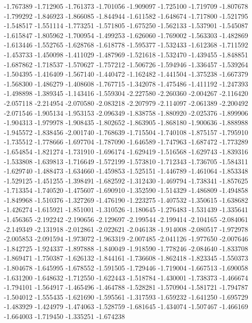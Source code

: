-1.767389
-1.712905
-1.761373
-1.701056
-1.909097
-1.725100
-1.719709
-1.807678
-1.799292
-1.846923
-1.866085
-1.844944
-1.611582
-1.648674
-1.717800
-1.521795
-1.548517
-1.551114
-1.773251
-1.571805
-1.675250
-1.562133
-1.537901
-1.545087
-1.615847
-1.805962
-1.700954
-1.499253
-1.626060
-1.769002
-1.563303
-1.482869
-1.613446
-1.552765
-1.628768
-1.618778
-1.595377
-1.532433
-1.612368
-1.711592
-1.453733
-1.450098
-1.411029
-1.487969
-1.521618
-1.532470
-1.439455
-1.848851
-1.687862
-1.718537
-1.570627
-1.757212
-1.506726
-1.594946
-1.336457
-1.539264
-1.504395
-1.416409
-1.567140
-1.440472
-1.162482
-1.441504
-1.375238
-1.667379
-1.568300
-1.486279
-1.408608
-1.767715
-1.342078
-1.475486
-1.411192
-1.247393
-1.498898
-1.389345
-1.143416
-1.559304
-2.227580
-2.260360
-2.004267
-2.116420
-2.057118
-2.214954
-2.070580
-2.083218
-2.207979
-2.114097
-2.061389
-2.200492
-2.071546
-1.905134
-1.953153
-2.096349
-1.838758
-1.880920
-2.025376
-1.899906
-1.904313
-1.979978
-1.908435
-1.802652
-1.863905
-1.868180
-1.900636
-1.888988
-1.945572
-1.838456
-2.001740
-1.768639
-1.715504
-1.740108
-1.875157
-1.795910
-1.735512
-1.778666
-1.697704
-1.787090
-1.646589
-1.747963
-1.687472
-1.773289
-1.654854
-1.821274
-1.731910
-1.696174
-1.629419
-1.516568
-1.629743
-1.839316
-1.533808
-1.639813
-1.716649
-1.572199
-1.573810
-1.712343
-1.736705
-1.584311
-1.629740
-1.488473
-1.634660
-1.459853
-1.525151
-1.446789
-1.461064
-1.853348
-1.529125
-1.451255
-1.398491
-1.682592
-1.312430
-1.469794
-1.738341
-1.857625
-1.713354
-1.740520
-1.475607
-1.690910
-1.352590
-1.514329
-1.486809
-1.494858
-1.849968
-1.510376
-1.327269
-1.476190
-1.223275
-1.407532
-1.350615
-1.638682
-1.426274
-1.615921
-1.851001
-1.310526
-1.180645
-1.276483
-1.531439
-1.335641
-1.456365
-2.192242
-2.190656
-2.129697
-2.199544
-2.199414
-2.104165
-2.084061
-2.149349
-2.131918
-2.012861
-2.022621
-2.046138
-1.914008
-2.080517
-1.972978
-2.005853
-2.091594
-1.973072
-1.963319
-2.007485
-2.041126
-1.977650
-2.007646
-1.842725
-1.924337
-1.897888
-1.840049
-1.918590
-1.778246
-2.084640
-1.833708
-1.869471
-1.750387
-1.626132
-1.844161
-1.736608
-1.862418
-1.823345
-1.550373
-1.804678
-1.645995
-1.678552
-1.591505
-1.729446
-1.719004
-1.667513
-1.690058
-1.631200
-1.648632
-1.712550
-1.622443
-1.518784
-1.430001
-1.738373
-1.466674
-1.794101
-1.564917
-1.465496
-1.464788
-1.528281
-1.570904
-1.581721
-1.794787
-1.504012
-1.555435
-1.621690
-1.595561
-1.317593
-1.659232
-1.641250
-1.695729
-1.483929
-1.424979
-1.474063
-1.528759
-1.681645
-1.434074
-1.507467
-1.466169
-1.664003
-1.719450
-1.335251
-1.674238
